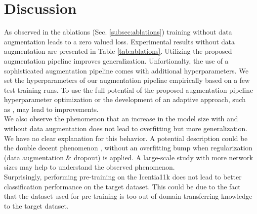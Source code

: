 \section{Discussion} \label{sec:discussion}
As observed in the ablations (Sec. \ref{subsec:ablations}) training without data augmentation leads to a zero valued loss. Experimental results without data augmentation are presented in Table \ref{tab:ablations}. Utilizing the proposed augmentation pipeline improves generalization. Unfortionalty, the use of a sophisticated augmentation pipeline comes with additional hyperparameters. We set the hyperparameters of our augmentation pipeline empirically based on a few test training runs. To use the full potential of the proposed augmentation pipeline hyperparameter optimization \cite{Goodfellow2016, Cubuk2019} or the development of an adaptive approach, such as \cite{Fawzi2016, Karras2020}, may lead to improvements.\\
\indent We also observe the phenomenon that an increase in the model size with and without data augmentation does not lead to overfitting but more generalization. We have no clear explanation for this behavior. A potential description could be the double decent phenomenon \cite{Belkin2019, Nakkiran2020}, without an overfitting bump when regularization (data augmentation \& dropout) is applied. A large-scale study with more network sizes may help to understand the observed phenomenon.\\
\indent Surprisingly, performing pre-training on the Icentia11k does not lead to better classification performance on the target dataset. This could be due to the fact that the dataset used for pre-training is too out-of-domain transferring knowledge to the target dataset.